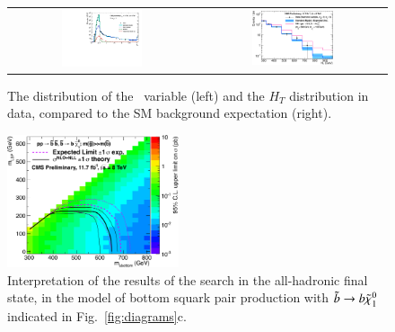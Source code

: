 \begin{figure}
\centering
\begin{tabular}{cc}
\includegraphics[width=0.45\textwidth]{HCPPlots/AlphaT_le3j_prelim.pdf} &
\includegraphics[width=0.45\textwidth]{HCPPlots/hadronic_2b_le3j_logy.pdf} \\
\end{tabular}
\caption{
The distribution of the \alphat\ variable (left) and the $H_T$ distribution in data, compared to the SM background expectation (right).
\label{fig:alphat}
}
\end{figure}


\begin{figure}
\centering
\includegraphics[width=0.45\textwidth]{HCPPlots/T2bb_interpretation.pdf}
\caption{
Interpretation of the results of the search in the all-hadronic final state, in the model of bottom squark pair production with $\tilde{b}\to b\lsp$
indicated in Fig.~\ref{fig:diagrams}c.
\label{fig:alphat_interpretation}
}
\end{figure}

